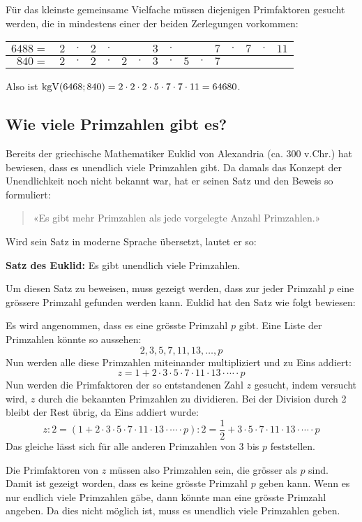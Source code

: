 Für das kleinste gemeinsame Vielfache müssen diejenigen Primfaktoren gesucht werden, die in mindestens einer der beiden Zerlegungen vorkommen:
\begin{center}
  \renewcommand{\arraystretch}{1.3}
  \begin{tabular}{rccccccccccccccc}
    \hline
      $6488=$ & \cellcolor{lightgreen} $2$ & $\cdot$ & \cellcolor{lightgreen} $2$ & $\cdot$ & & & \cellcolor{lightgreen} $3$ & $\cdot$ & & & \cellcolor{lightgreen} $7$ & $\cdot$ & \cellcolor{lightgreen} $7$ & $\cdot$ & \cellcolor{lightgreen} $11$ \\
    \hline
       $840=$ & $2$ & $\cdot$ & $2$ & $\cdot$ & \cellcolor{lightgreen} $2$ & $\cdot$ & $3$ & $\cdot$ & \cellcolor{lightgreen} $5$ & $\cdot$ & $7$ & & & & \\
    \hline
  \end{tabular}
\end{center}
Also ist $\operatorname{kgV}(6468;840) = 2\cdot2\cdot2\cdot5\cdot7\cdot7\cdot11 = 64680$.

\subsection{Wie viele Primzahlen gibt es?}

Bereits der griechische Mathematiker Euklid von Alexandria (ca. 300 v.Chr.) hat bewiesen, dass es unendlich viele Primzahlen gibt. Da damals das Konzept der Unendlichkeit noch nicht bekannt war, hat er seinen Satz und den Beweis so formuliert:
\begin{quote}
  «Es gibt mehr Primzahlen als jede vorgelegte Anzahl Primzahlen.»
\end{quote}
Wird sein Satz in moderne Sprache übersetzt, lautet er so:
\begin{theorem}
  \textbf{Satz des Euklid:} Es gibt unendlich viele Primzahlen.
\end{theorem}

Um diesen Satz zu beweisen, muss gezeigt werden, dass zur jeder Primzahl $p$ eine grössere Primzahl gefunden werden kann. Euklid hat den Satz wie folgt bewiesen:

Es wird angenommen, dass es eine grösste Primzahl $p$ gibt. Eine Liste der Primzahlen könnte so aussehen:
\[
  2, 3, 5, 7, 11, 13, \ldots, p
\]
Nun werden alle diese Primzahlen miteinander multipliziert und zu Eins addiert:
\[
  z = 1 + 2\cdot 3\cdot 5\cdot 7\cdot 11\cdot 13\cdot\cdots\cdot p
\]
Nun werden die Primfaktoren der so entstandenen Zahl $z$ gesucht, indem versucht wird, $z$ durch die bekannten Primzahlen zu dividieren. Bei der Division durch 2 bleibt der Rest übrig, da Eins addiert wurde:
\[
  z:2 = (1 + 2\cdot 3\cdot 5\cdot 7\cdot 11\cdot 13\cdot\cdots\cdot p):2 = \frac{1}{2}+ 3\cdot 5\cdot 7\cdot 11\cdot 13\cdot\cdots\cdot p
\]
Das gleiche lässt sich für alle anderen Primzahlen von 3 bis $p$ feststellen.

Die Primfaktoren von $z$ müssen also Primzahlen sein, die grösser als $p$ sind. Damit ist gezeigt worden, dass es keine grösste Primzahl $p$ geben kann. Wenn es nur endlich viele Primzahlen gäbe, dann könnte man eine grösste Primzahl angeben. Da dies nicht möglich ist, muss es unendlich viele Primzahlen geben.
